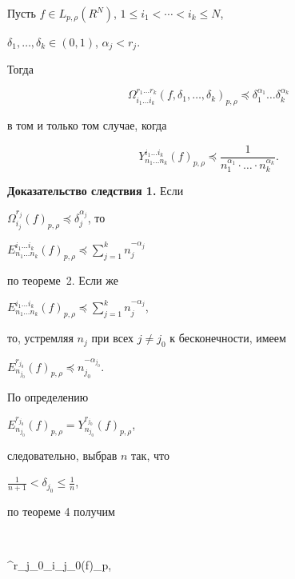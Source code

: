  


\begin{cor} 


Пусть $f\in L_{p,\rho}(R^N)$, $1\le i_1<\dotsb<i_k\le N$, 


$\delta_1,\dotsc,\delta_k\in(0,1)$, $\alpha_j<r_j$. 


Тогда 


$$ 


\Omega^{r_1\dotsc r_k}_{i_1\dotsc i_k} 


(f,\delta_1,\dotsc,\delta_k)_{p,\rho}\preceq 


\delta^{\alpha_1}_1\dotsc\delta^{\alpha_k}_k 


$$ 


в том и только том случае, когда 


$$ 


Y^{i_1\dotsc i_k}_{n_1\dotsc n_k}(f)_{p,\rho}\preceq 


\frac{1}{n^{\alpha_1}_1\cdot\dotsc\cdot n^{\alpha_k}_k}. 


$$ 


\end{cor} 


 


{\bf Доказательство следствия 1.} Если 


$\Omega^{r_j}_{i_j}(f)_{p,\rho}\preceq\delta^{\alpha_j}_j$, то 


$E^{i_1\dotsc i_k}_{n_1\dotsc n_k}(f)_{p,\rho}\preceq 


\sum\limits^k_{j=1}n^{-\alpha_j}_j$ 


по теореме~2. Если же 


$E^{i_1\dotsc i_k}_{n_1\dotsc n_k}(f)_{p,\rho}\preceq 


\sum\limits^k_{j=1}n^{-\alpha_j}_j$, 


то, устремляя $n_j$ при всех $j\ne j_0$ к бесконечности, имеем 


$E^{r_{j_0}}_{n_{j_0}}(f)_{p,\rho}\preceq n^{-\alpha_{j_0}}_{j_0}$.


По определению


$E^{r_{j_0}}_{n_{j_0}}(f)_{p,\rho}=Y^{r_{j_0}}_{n_{j_0}}(f)_{p,\rho}$,


следовательно, выбрав $n$ так, что 


$\frac{1}{n+1}<\delta_{j_0}\le\frac{1}{n}$, 


по теореме 4 получим 


$$ 


\Omega^{r_{j_0}}_{i_{j_0}}(f)_{p,\rho}\preceq 


